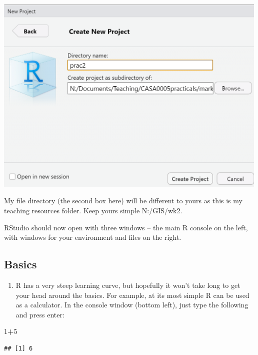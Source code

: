 \documentclass[]{book}
\newenvironment{Shaded}{\begin{snugshade}}{\end{snugshade}}
\newcommand{\DecValTok}[1]{\textcolor[rgb]{0.00,0.00,0.81}{#1}}
\newcommand{\OperatorTok}[1]{\textcolor[rgb]{0.81,0.36,0.00}{\textbf{#1}}}
\providecommand{\tightlist}{%
  \setlength{\itemsep}{0pt}\setlength{\parskip}{0pt}}
\begin{document}
\begin{center}\includegraphics[width=500px]{prac2_images/new_proj} \end{center}

My file directory (the second box here) will be different to yours as this is my teaching resources folder. Keep yours simple N:/GIS/wk2.

RStudio should now open with three windows -- the main R console on the left, with windows for your environment and files on the right.

\hypertarget{basics-1}{%
\subsection{Basics}\label{basics-1}}

\begin{enumerate}
\def\labelenumi{\arabic{enumi}.}
\tightlist
\item
  R has a very steep learning curve, but hopefully it won't take long to get your head around the basics. For example, at its most simple R can be used as a calculator. In the console window (bottom left), just type the following and press enter:
\end{enumerate}

\begin{Shaded}
\begin{Highlighting}[]
\DecValTok{1}\OperatorTok{+}\DecValTok{5}
\end{Highlighting}
\end{Shaded}

\begin{verbatim}
## [1] 6
\end{verbatim}
\end{document}
